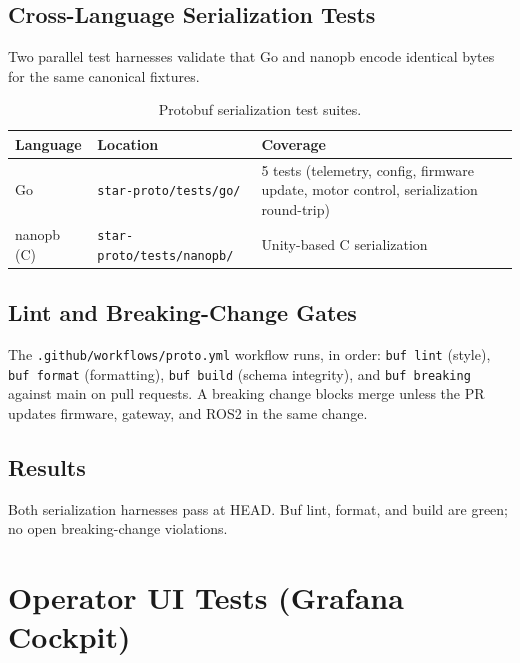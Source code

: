 \documentclass[11pt,letterpaper]{article}
\begin{document}
\subsection{Cross-Language Serialization Tests}
Two parallel test harnesses validate that Go and nanopb encode
identical bytes for the same canonical fixtures.

\begin{table}[H]
\centering
\caption{Protobuf serialization test suites.}
\label{tab:proto-tests}
\small
\begin{tabularx}{\linewidth}{l l X}
\toprule
\textbf{Language} & \textbf{Location} & \textbf{Coverage} \\
\midrule
Go        & \texttt{star-proto/tests/go/}         & 5 tests (telemetry, config,
                                                    firmware update, motor control,
                                                    serialization round-trip) \\
nanopb (C) & \texttt{star-proto/tests/nanopb/}    & Unity-based C serialization \\
\bottomrule
\end{tabularx}
\end{table}

\subsection{Lint and Breaking-Change Gates}
The \texttt{.github/workflows/proto.yml} workflow runs, in order:
\texttt{buf lint} (style), \texttt{buf format} (formatting),
\texttt{buf build} (schema integrity), and \texttt{buf breaking}
against main on pull requests. A breaking change blocks merge unless
the PR updates firmware, gateway, and ROS2 in the same change.

\subsection{Results}
Both serialization harnesses pass at HEAD. Buf lint, format, and
build are green; no open breaking-change violations.

\section{Operator UI Tests (Grafana Cockpit)}
\label{sec:ui}
\end{document}
